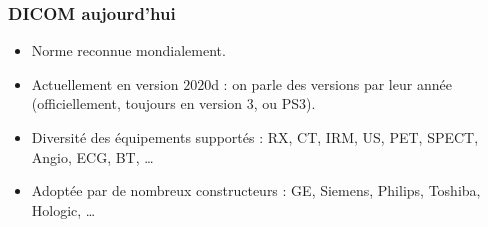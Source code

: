 	\frame
	{
		\frametitle{DICOM aujourd'hui}
		\begin{itemize}
			\item Norme reconnue mondialement.
			\item Actuellement en version $2020$d : on parle des versions par leur ann\'ee (officiellement, toujours en version 3, ou PS3).
			\item Diversit\'e des \'equipements support\'es : RX, CT, IRM, US, PET, SPECT, Angio, ECG, BT, \ldots
			\item Adopt\'ee par de nombreux constructeurs : GE, Siemens, Philips, Toshiba, Hologic, \ldots
		\end{itemize}
	}
